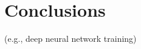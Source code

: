 \documentclass[journal]{IEEEtran}
\begin{document}
\section{Conclusions}


 (e.g., deep neural network training)

\ifCLASSOPTIONcaptionsoff
  \newpage
\fi




\end{document}
